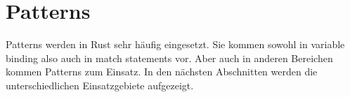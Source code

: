 \section{Patterns}
Patterns werden in Rust sehr häufig eingesetzt. Sie kommen sowohl in variable binding also auch in match statements vor. Aber auch in anderen Bereichen kommen Patterns zum Einsatz.
In den nächsten Abschnitten werden die unterschiedlichen Einsatzgebiete aufgezeigt.







